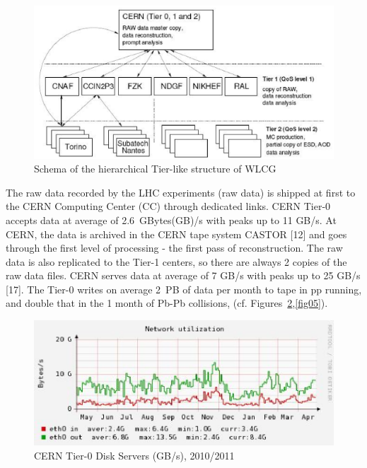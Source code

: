 \documentclass{intech}
\begin{document}
\begin{figure}[htb] %
\centering
\includegraphics[width=13cm]{fig03.eps} %
\caption{Schema of the hierarchical Tier-like structure of
WLCG}\label{fig03}
\end{figure}




The raw data recorded by the LHC experiments (raw data) is shipped
at first to the CERN Computing Center (CC) through dedicated links.
CERN Tier-0 accepts data at average of 2.6~GBytes(GB)/s with peaks
up to 11 GB/s. At CERN, the data is archived in the CERN tape system
CASTOR [12] and goes through the first level of processing - the
first pass of reconstruction. The raw data is also replicated to the
Tier-1 centers, so there are always 2 copies of the raw data files.
CERN serves data at average of 7 GB/s with peaks up to 25 GB/s [17].
The Tier-0 writes on average 2~PB of data per month to tape in pp
running, and double that in the 1 month of Pb-Pb collisions, (cf.
Figures~\ref{fig04},\ref{fig05}).


\begin{figure}[htb] %
\centering
\includegraphics[width=13cm]{fig04.eps} %
\caption{CERN Tier-0 Disk Servers (GB/s), 2010/2011}\label{fig04}
\end{figure}
\end{document}
